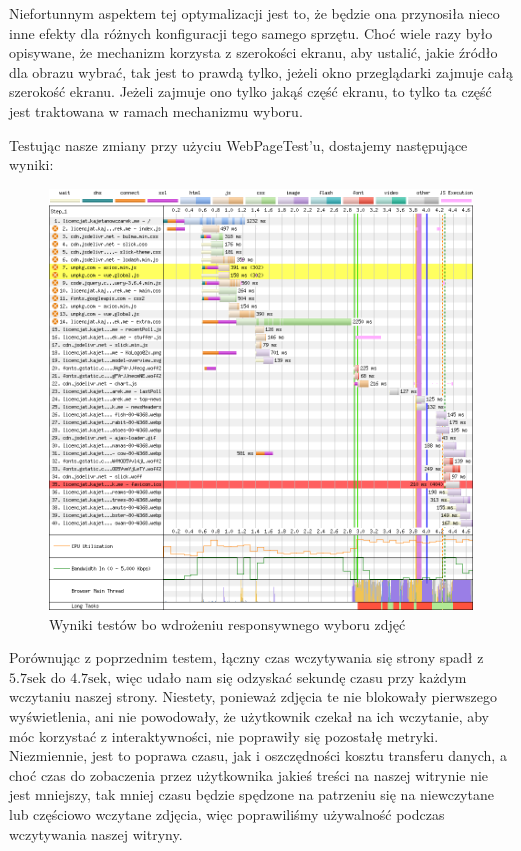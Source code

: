 \documentclass[licencjacka]{pracadypl}
\begin{document}
Niefortunnym aspektem tej optymalizacji jest to, że będzie ona przynosiła nieco inne efekty dla różnych konfiguracji tego samego sprzętu. Choć wiele razy było opisywane, że mechanizm korzysta z szerokości ekranu, aby ustalić, jakie źródło dla obrazu wybrać, tak jest to prawdą tylko, jeżeli okno przeglądarki zajmuje całą szerokość ekranu. Jeżeli zajmuje ono tylko jakąś część ekranu, to tylko ta część jest traktowana w ramach mechanizmu wyboru.

Testując nasze zmiany przy użyciu WebPageTest'u, dostajemy następujące wyniki:

\begin{figure}[H]
  \includegraphics[width=\linewidth]{images/waterfall-after-sizing.png}
  \caption{Wyniki testów bo wdrożeniu responsywnego wyboru zdjęć}
  \label{fig:waterfall-after-sizing}
\end{figure}

Porównując z poprzednim testem, łączny czas wczytywania się strony spadł z $5.7\text{sek}$ do $4.7\text{sek}$, więc udało nam się odzyskać sekundę czasu przy każdym wczytaniu naszej strony. Niestety, ponieważ zdjęcia te nie blokowały pierwszego wyświetlenia, ani nie powodowały, że użytkownik czekał na ich wczytanie, aby móc korzystać z interaktywności, nie poprawiły się pozostałę metryki. Niezmiennie, jest to poprawa czasu, jak i oszczędności kosztu transferu danych, a choć czas do zobaczenia przez użytkownika jakieś treści na naszej witrynie nie jest mniejszy, tak mniej czasu będzie spędzone na patrzeniu się na niewczytane lub częściowo wczytane zdjęcia, więc poprawiliśmy używalność podczas wczytywania naszej witryny.
\end{document}
